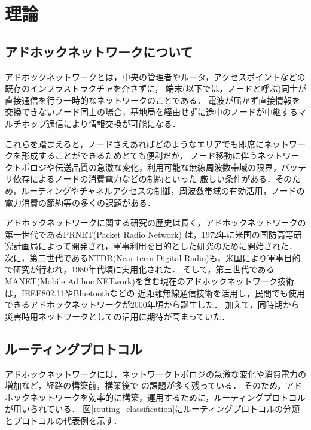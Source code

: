\documentclass[a4paper, 11pt]{ltjsarticle}
\begin{document}
\clearpage
\section{理論}
\subsection{アドホックネットワークについて} \label{about_ad-hoc}
アドホックネットワークとは，中央の管理者やルータ，アクセスポイントなどの既存のインフラストラクチャを介さずに，
端末(以下では，ノードと呼ぶ)同士が直接通信を行う一時的なネットワークのことである．
電波が届かず直接情報を交換できないノード同士の場合，基地局を経由せずに途中のノードが中継するマルチホップ通信により情報交換が可能になる．

これらを踏まえると，ノードさえあればどのようなエリアでも即席にネットワークを形成することができるためとても便利だが，
ノード移動に伴うネットワークトポロジや伝送品質の急激な変化，利用可能な無線周波数帯域の限界，バッテリ依存によるノードの消費電力などの制約といった
厳しい条件がある．そのため，ルーティングやチャネルアクセスの制御，周波数帯域の有効活用，ノードの電力消費の節約等の多くの課題がある\cite{間瀬憲一2001アドホックネットワーク}．

アドホックネットワークに関する研究の歴史は長く，アドホックネットワークの第一世代であるPRNET(Packet Radio Network)
は，1972年に米国の国防高等研究計画局によって開発され，軍事利用を目的とした研究のために開始された．
次に，第二世代であるNTDR(Near-term Digital Radio)も，米国により軍事目的で研究が行われ，1980年代頃に実用化された．
そして，第三世代であるMANET(Mobile Ad hoc NETwork)を含む現在のアドホックネットワーク技術は，IEEE802.11やBluetoothなどの
近距離無線通信技術を活用し，民間でも使用できるアドホックネットワークが2000年頃から誕生した．
加えて，同時期から災害時用ネットワークとしての活用に期待が高まっていた．

\subsection{ルーティングプロトコル}
アドホックネットワークには，ネットワークトポロジの急激な変化や消費電力の増加など，経路の構築前，構築後で
の課題が多く残っている．
そのため，アドホックネットワークを効率的に構築，運用するために，ルーティングプロトコルが用いられている．
図\ref{routing_classification}にルーティングプロトコルの分類とプロトコルの代表例を示す．
\end{document}
